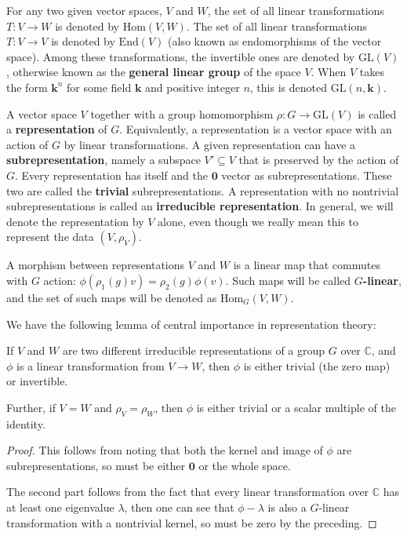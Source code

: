 		For any two given vector spaces, $V$ and $W$, the set of all linear transformations $T: V \to W$ is denoted by $\mathrm{Hom}(V, W)$. The set of all linear transformations $T: V \to V$ is denoted by $\mathrm{End}(V)$ (also known as endomorphisms of the vector space). Among these transformations, the invertible ones are denoted by $\mathrm{GL}(V)$, otherwise known as the \textbf{general linear group} of the space $V$. When $V$ takes the form $\mathbf k^n$ for some field $\mathbf k$ and positive integer $n$, this is denoted $\mathrm{GL}(n, \mathbf k)$. 

		 A vector space $V$ together with a group homomorphism $\rho: G \to \mathrm{GL}(V)$ is called a \textbf{representation} of $G$. Equivalently, a representation is a vector space with an action of $G$ by linear transformations. A given representation can have a \textbf{subrepresentation}, namely a subspace $V' \subseteq V$ that is preserved by the action of $G$. Every representation has itself and the $\mathbf 0$ vector as subrepresentations. These two are called the \textbf{trivial} subrepresentations. A representation with no nontrivial subrepresentations is called an \textbf{irreducible representation}. In general, we will denote the representation by $V$ alone, even though we really mean this to represent the data $(V, \rho_V)$.
		 
		A morphism between representations $V$ and $W$ is a linear map that commutes with $G$ action: $\phi(\rho_1(g)  v) = \rho_2 (g) \phi (v)$. Such maps will be called $G$\textbf{-linear}, and the set of such maps will be denoted as $\mathrm{Hom}_G(V, W)$.
		
		 
		We have the following lemma of central importance in representation theory: 
		\begin{lemma}
			If $V$ and $W$ are two different irreducible representations of a group $G$ over $\mathbb C$, and $\phi$ is a linear transformation from $V \to W$, then $\phi$ is either trivial (the zero map) or invertible.
			
			Further, if $V=W$ and $\rho_V=\rho_W$, then $\phi$ is either trivial or a scalar multiple of the identity. 
		\end{lemma}
		\begin{proof}
			This follows from noting that both the kernel and image of $\phi$ are subrepresentations, so must be either $\mathbf 0$ or the whole space. 
			
			The second part follows from the fact that every linear transformation over $\mathbb C$ has at least one eigenvalue $\lambda$, then one can see that $\phi - \lambda$ is also a $G$-linear transformation with a nontrivial kernel, so must be zero by the preceding.
		\end{proof}
		
